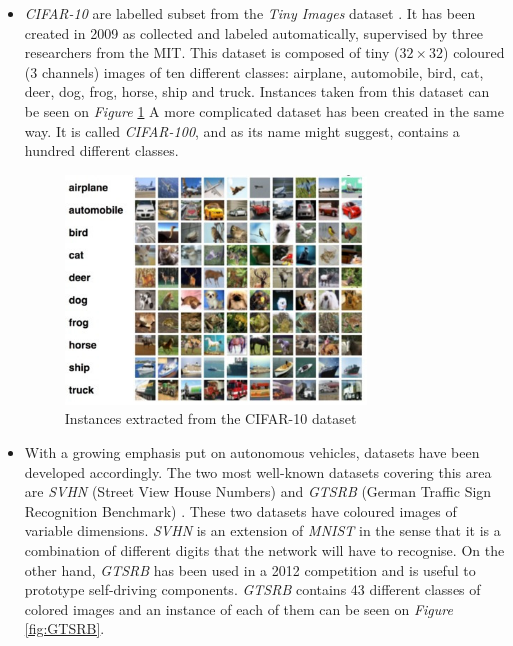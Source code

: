 \begin{itemize}
  \item \emph{CIFAR-10} are labelled subset from the \emph{Tiny Images} dataset \cite{Krizhevsky2009}. It has been created in 2009 as collected and labeled automatically, supervised by three researchers from the MIT. This dataset is composed of tiny ($32 \times 32$) coloured (3 channels) images of ten different classes: airplane, automobile, bird, cat, deer, dog, frog, horse, ship and truck. Instances taken from this dataset can be seen on \emph{Figure} \ref{fig:CIFAR-10} A more complicated dataset has been created in the same way. It is called \emph{CIFAR-100}, and as its name might suggest, contains a hundred different classes.

  \begin{figure}[htbp]
  	\centering
  		\includegraphics[width=8cm]{Figures/CIFAR-10.jpg}
  	\caption[CIFAR-10]{Instances extracted from the CIFAR-10 dataset}
  	\label{fig:CIFAR-10}
  \end{figure}

  \item With a growing emphasis put on autonomous vehicles, datasets have been developed accordingly. The two most well-known datasets covering this area are \emph{SVHN} (Street View House Numbers) \cite{Netzer2011} and \emph{GTSRB} (German Traffic Sign Recognition Benchmark) \cite{Stallkamp2012}. These two datasets have coloured images of variable dimensions. \emph{SVHN} is an extension of \emph{MNIST} in the sense that it is a combination of different digits that the network will have to recognise. On the other hand, \emph{GTSRB} has been used in a 2012 competition and is useful to prototype self-driving components. \emph{GTSRB} contains 43 different classes of colored images and an instance of each of them can be seen on \emph{Figure} \ref{fig:GTSRB}.



\end{itemize}
